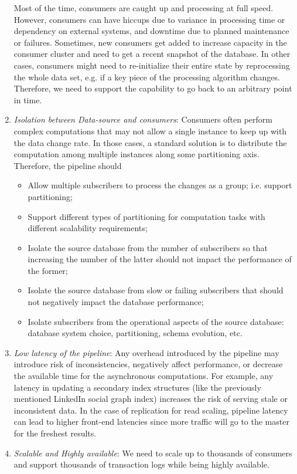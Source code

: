 \begin{enumerate}[I]
Most of the time, consumers are caught up and processing at full speed. However, consumers can have hiccups due to variance in processing time or dependency on external systems, and downtime due to planned maintenance or failures. Sometimes, new consumers get added to increase capacity in the consumer cluster and need to get a recent snapshot of the database. In other cases, consumers might need to re-initialize their entire state by reprocessing the whole data set, e.g. if a key piece of the processing algorithm changes. Therefore, we need to support the capability to go back to an arbitrary point in time.
\item \emph{Isolation between Data-source and consumers}: 
Consumers often perform complex computations that may not allow a single instance to keep up with the data change rate. In those cases, a standard solution is to distribute the computation among multiple instances along some partitioning axis.
Therefore, the pipeline should
\begin{itemize}
\item Allow multiple subscribers to process the changes as a group; i.e. support partitioning;
\item Support different types of partitioning for computation tasks with different scalability requirements;
\item Isolate the source database from the number of subscribers so that increasing the number of the latter should not impact the performance of the former;
\item Isolate the source database from slow or failing subscribers that should not negatively impact the database performance;
\item Isolate subscribers from the operational aspects of the source database: database system choice, partitioning, schema evolution, etc.  
\end{itemize}
\item \emph{Low latency of the pipeline}: Any overhead introduced by the pipeline may introduce risk of inconsistencies, negatively affect performance, or decrease the available time for the asynchronous computations. For example, any latency in updating a secondary index structures (like the previously mentioned LinkedIn social graph index) increases the risk of serving stale or inconsistent data. In the case of replication for read scaling, pipeline latency can lead to higher front-end latencies since more traffic will go to the master for the freshest results. 
\item \emph{Scalable and Highly available}: We need to scale up to thousands of consumers and support thousands of transaction logs while being highly available. 
\end{enumerate}
